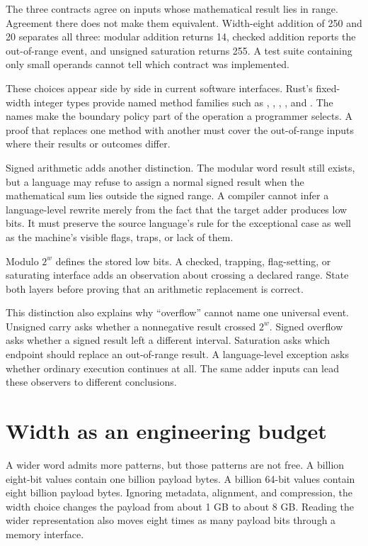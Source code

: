 The three contracts agree on inputs whose mathematical result lies in range.
Agreement there does not make them equivalent. Width-eight addition of 250
and 20 separates all three: modular addition returns 14, checked addition
reports the out-of-range event, and unsigned saturation returns 255. A test
suite containing only small operands cannot tell which contract was
implemented.

These choices appear side by side in current software interfaces. Rust's
fixed-width integer types provide named method families such as
, , ,
, and .\autocite{rust2026u8} The names
make the boundary policy part of the operation a programmer selects. A proof
that replaces one method with another must cover the out-of-range inputs where
their results or outcomes differ.

Signed arithmetic adds another distinction. The modular word result still
exists, but a language may refuse to assign a normal signed result when the
mathematical sum lies outside the signed range. A compiler cannot infer a
language-level rewrite merely from the fact that the target adder produces
low bits. It must preserve the source language's rule for the exceptional
case as well as the machine's visible flags, traps, or lack of them.

\begin{keyidea}[title={The carrier does not choose the error policy}]
Modulo \(2^w\) defines the stored low bits. A checked, trapping, flag-setting,
or saturating interface adds an observation about crossing a declared range.
State both layers before proving that an arithmetic replacement is correct.
\end{keyidea}

This distinction also explains why ``overflow'' cannot name one universal
event. Unsigned carry asks whether a nonnegative result crossed \(2^w\).
Signed overflow asks whether a signed result left a different interval.
Saturation asks which endpoint should replace an out-of-range result. A
language-level exception asks whether ordinary execution continues at all.
The same adder inputs can lead these observers to different conclusions.

\section{Width as an engineering budget}

A wider word admits more patterns, but those patterns are not free. A billion
eight-bit values contain one billion payload bytes. A billion 64-bit values
contain eight billion payload bytes. Ignoring metadata, alignment, and
compression, the width choice changes the payload from about 1 GB to about
8 GB. Reading the wider representation also moves eight times as many payload
bits through a memory interface.

